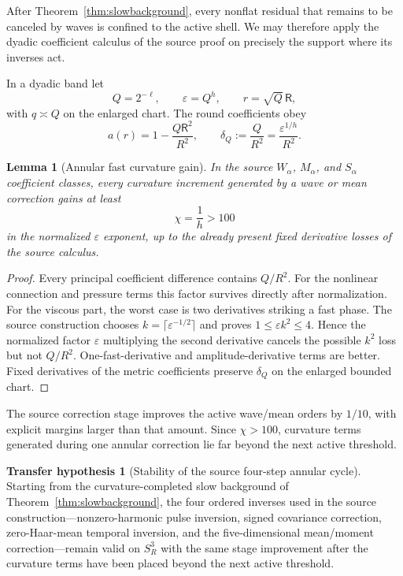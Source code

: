 \documentclass[aps,prd,reprint,superscriptaddress,nofootinbib,floatfix]{revtex4-2}
\newtheorem{lemma}[theorem]{Lemma}
\theoremstyle{definition}
\newtheorem{hypothesis}[theorem]{Transfer hypothesis}
\theoremstyle{remark}
\newcommand{\eps}{\varepsilon}
\begin{document}
After Theorem~\ref{thm:slowbackground}, every nonflat residual that remains to be canceled by waves is confined to the active shell. We may therefore apply the dyadic coefficient calculus of the source proof on precisely the support where its inverses act.

In a dyadic band let
\begin{equation}
	Q=2^{-\ell},\qquad \eps=Q^h,
	\qquad r=\sqrt Q\,\mathsf R,
	\label{eq:dyadic}
\end{equation}
with $q\asymp Q$ on the enlarged chart. The round coefficients obey
\begin{equation}
	a(r)=1-\frac{Q\mathsf R^2}{R^2},\qquad
	\delta_Q:=\frac{Q}{R^2}=\frac{\eps^{1/h}}{R^2}.
	\label{eq:deltaQ}
\end{equation}

\begin{lemma}[Annular fast curvature gain]\label{lem:fast}
	In the source $W_\alpha$, $M_\alpha$, and $S_\alpha$ coefficient classes, every curvature increment generated by a wave or mean correction gains at least
	\begin{equation}
		\chi=\frac1h>100
		\label{eq:fastchi}
	\end{equation}
	in the normalized $\eps$ exponent, up to the already present fixed derivative losses of the source calculus.
\end{lemma}

\begin{proof}
	Every principal coefficient difference contains $Q/R^2$. For the nonlinear connection and pressure terms this factor survives directly after normalization. For the viscous part, the worst case is two derivatives striking a fast phase. The source construction chooses $k=\lceil\eps^{-1/2}\rceil$ and proves $1\le\eps k^2\le4$. Hence the normalized factor $\eps$ multiplying the second derivative cancels the possible $k^2$ loss but not $Q/R^2$. One-fast-derivative and amplitude-derivative terms are better. Fixed derivatives of the metric coefficients preserve $\delta_Q$ on the enlarged bounded chart.
\end{proof}

The source correction stage improves the active wave/mean orders by $1/10$, with explicit margins larger than that amount. Since $\chi>100$, curvature terms generated during one annular correction lie far beyond the next active threshold.

\begin{hypothesis}[Stability of the source four-step annular cycle]\label{hyp:cycle}
	Starting from the curvature-completed slow background of Theorem~\ref{thm:slowbackground}, the four ordered inverses used in the source construction---nonzero-harmonic pulse inversion, signed covariance correction, zero-Haar-mean temporal inversion, and the five-dimensional mean/moment correction---remain valid on \(S^3_R\) with the same stage improvement after the curvature terms have been placed beyond the next active threshold.
\end{hypothesis}
\end{document}
